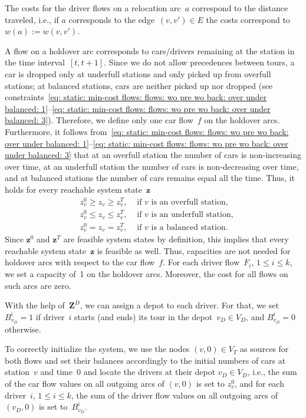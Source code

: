 \documentclass[english]{llncs}
\numberwithin{sublemma}{lemma}
\newcommand{\fc}{\ensuremath{f}}
\newcommand{\fd}{\ensuremath{F}}
\newcommand{\bd}{\ensuremath{B}}
\newcommand{\z}{\boldsymbol{z}}
\newcommand{\zd}{\boldsymbol{Z}^D} \newcommand{\zzd}{Z^D}
\newcommand{\VD}{V_D}
\begin{document}
The costs for the driver flows on a relocation arc~$a$ correspond to the distance traveled, i.e., if $a$ corresponds to the edge~$(v,v') \in E$ the costs correspond to $w(a) := w(v, v')$.


A flow on a holdover arc corresponds to cars/drivers remaining at the station in the time interval~$[t,t+1]$.
Since we do not allow precedences between tours, a car is dropped only at underfull stations and only picked up from overfull stations;
at balanced stations, cars are neither picked up nor dropped (see constraints~\eqref{eq: static: min-cost flows: flows: wo pre wo back: over under balanced: 1}--\eqref{eq: static: min-cost flows: flows: wo pre wo back: over under balanced: 3}).
Therefore, we define only one car flow~$\fc$ on the holdover arcs.
Furthermore, it follows from~\eqref{eq: static: min-cost flows: flows: wo pre wo back: over under balanced: 1}--\eqref{eq: static: min-cost flows: flows: wo pre wo back: over under balanced: 3}
that at an overfull station the number of cars is non-increasing over time, at an underfull station the number of cars is non-decreasing over time, and at balanced stations the number of cars remains equal all the time.
Thus, it holds for every reachable system state~$\z$
\begin{align*}
  & z^0_v \geq z_v \geq z^T_v, & \text{ if $v$ is an overfull station,} \\
  & z^0_v \leq z_v \leq z^T_v, & \text{ if $v$ is an underfull station,} \\
  & z^0_v = z_v = z^T_v, & \text{ if $v$ is a balanced station.}
\end{align*}
Since $\z^0$ and $\z^T$ are feasible system states by definition, this implies that every reachable system state~$\z$ is feasible as well.
Thus, capacities are not needed for holdover arcs with respect to the car flow~$\fc$.
For each driver flow~$\fd_i$, $1 \leq i \leq k$, we set a capacity of~1 on the holdover arcs.
Moreover, the cost for all flows on such arcs are zero.




With the help of~$\zd$, we can assign a depot to each driver.
For that, we set $\bd_{v_D}^i = 1$ if driver~$i$ starts (and ends) its tour in the depot~$v_D \in \VD$, and $\bd_{v_D}^i = 0$ otherwise.

To correctly initialize the system, we use the nodes $(v, 0) \in V_T$ as sources for both flows and set their 
balances accordingly to the initial numbers of cars at station~$v$ and time~$0$ and locate the drivers at their depot $v_D \in \VD$, i.e.,
the sum of the car flow values on all outgoing arcs of $(v, 0)$ is set to $z_v^0$, and for each driver~$i$, $1 \leq i \leq k$, the sum of the driver flow values on all outgoing arcs of $(v_D, 0)$ is set to~$\bd_{v_D}^i$.
\end{document}
